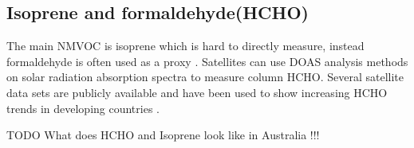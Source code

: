 \subsection{Isoprene and formaldehyde(HCHO)}

The main NMVOC is isoprene \cite{Guenther_2006} which is hard to directly measure, instead formaldehyde is often used as a proxy \cite{Marais_2012,bauwens2013satellite}. 
Satellites can use DOAS analysis methods on solar radiation absorption spectra to measure column HCHO.
Several satellite data sets are publicly available and have been used to show increasing HCHO trends in developing countries \cite{Mahajan_2015}.
  
TODO What does HCHO and Isoprene look like in Australia !!!